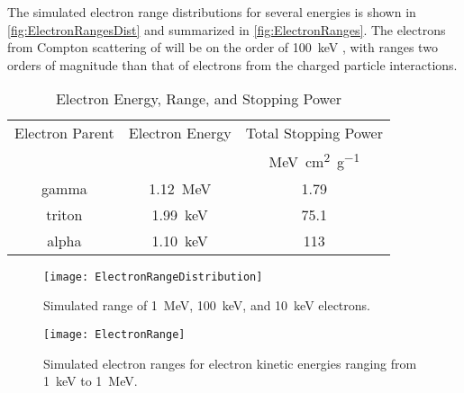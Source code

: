 The simulated electron range distributions for several energies is shown in \autoref{fig:ElectronRangesDist} and summarized in \autoref{fig:ElectronRanges}.
The electrons  from Compton scattering of  will be on the order of \SI{100}{\keV} , with ranges two orders of magnitude than that of electrons from the charged particle interactions.
\begin{table}[ht]
  \caption[Electron Energy, Range, and Stopping Power]{Electron Energy, Range, and Stopping Power \protect\cite{berger_estar_2005,turner_atoms_2008}}
	\centering
	\begin{tabular}{c | c S}
	\toprule
	{Electron Parent} & {Electron Energy} & {Total Stopping Power} \\
	 &  & \si{\mega\eV \cm\squared \per \gram} \\
	\midrule
	{gamma}  & \SI{1.12}{\mega\eV} & 1.79 \\
	{triton} & \SI{1.99}{\kilo\eV} & 75.1 \\
	{alpha}  & \SI{1.10}{\kilo\eV} & 113  \\
	\bottomrule
	\end{tabular}
  \label{tab:BasicEDepOutline}
\end{table}
\begin{figure}
  \centering
      \texttt{[image: ElectronRangeDistribution]}
      \caption[Simulated Electron Ranges Distributions in Polystyrene]{Simulated range of \SI{1}{\MeV}, \SI{100}{\keV}, and \SI{10}{\keV} electrons.\rangeSimGeo}
      \label{fig:ElectronRangesDist}
\end{figure}
\begin{figure}
	\centering
      \texttt{[image: ElectronRange]}
  \caption[Simulated Electron Ranges in Polystyrene]{Simulated electron ranges for electron kinetic energies ranging from \SI{1}{\keV} to \SI{1}{\MeV}.\rangeSimGeo} 
  \label{fig:ElectronRanges}
\end{figure}

